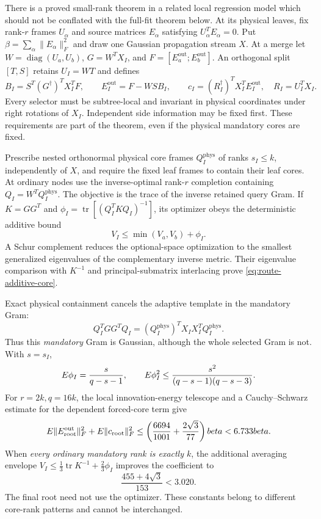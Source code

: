 \documentclass[11pt,oneside,openany,a4paper]{report}
\numberwithin{equation}{chapter}
\theoremstyle{definition}
\theoremstyle{remark}
\DeclareMathOperator{\tr}{tr}\DeclareMathOperator{\rank}{rank}
\DeclareMathOperator{\diag}{diag}\DeclareMathOperator{\range}{range}
\begin{document}
There is a proved small-rank theorem in a related local regression
model which should not be conflated with the full-fit theorem below.
At its physical leaves, fix rank-$r$ frames $U_\alpha$ and source
matrices $E_\alpha$ satisfying $U_\alpha^TE_\alpha=0$.
Put $\beta=\sum_\alpha\lVert E_\alpha\rVert_F^2$ and draw one Gaussian
propagation stream $X$.  At a merge let $W=\diag(U_a,U_b)$,
$G=W^TX_I$, and $F=[E_a^{\mathrm{out}};E_b^{\mathrm{out}}]$.
An orthogonal split $[T,S]$ retains $U_I=WT$ and defines
\[
 B_I=S^T(G^\dagger)^TX_I^TF,\qquad
 E_I^{\mathrm{out}}=F-WSB_I,\qquad
 c_I=(R_I^\dagger)^TX_I^TE_I^{\mathrm{out}},
 \quad R_I=U_I^TX_I.
\]
Every selector must be subtree-local and invariant in physical
coordinates under right rotations of $X_I$.  Independent side
information may be fixed first.  These requirements are part of the
theorem, even if the physical mandatory cores are fixed.

Prescribe nested orthonormal physical core frames $Q_I^{\mathrm{phys}}$
of ranks $s_I\leq k$, independently of $X$, and require the fixed leaf
frames to contain their leaf cores.  At ordinary nodes use the
inverse-optimal rank-$r$ completion containing
$Q_I=W^TQ_I^{\mathrm{phys}}$.  The objective is the trace of the inverse
retained query Gram.  If $K=GG^T$ and
$\phi_I=\tr[(Q_I^TKQ_I)^{-1}]$, its optimizer obeys the deterministic
additive bound
\begin{equation}
 V_I\leq\min(V_a,V_b)+\phi_I.
 \label{eq:route-additive-core}
\end{equation}
A Schur complement reduces the optional-space optimization to the
smallest generalized eigenvalues of the complementary inverse metric.
Their eigenvalue comparison with $K^{-1}$ and principal-submatrix
interlacing prove \eqref{eq:route-additive-core}.

Exact physical containment cancels the adaptive template in the
mandatory Gram:
\[
 Q_I^TGG^TQ_I
 =(Q_I^{\mathrm{phys}})^TX_IX_I^TQ_I^{\mathrm{phys}}.
\]
Thus this \emph{mandatory} Gram is Gaussian, although the whole selected
Gram is not.  With $s=s_I$,
\[
 E\phi_I=\frac{s}{q-s-1},\qquad
 E\phi_I^2\leq\frac{s^2}{(q-s-1)(q-s-3)}.
\]
For $r=2k,q=16k$, the local innovation-energy telescope and a
Cauchy--Schwarz estimate for the dependent forced-core term give
\begin{equation}
 E\lVert E_{\mathrm{root}}^{\mathrm{out}}\rVert_F^2
 +E\lVert c_{\mathrm{root}}\rVert_F^2
 \leq\left(\frac{6694}{1001}+\frac{2\sqrt3}{77}\right)beta
 <6.733beta.
 \label{eq:route-fixed-core}
\end{equation}
When \emph{every ordinary mandatory rank is exactly $k$}, the additional
averaging envelope
$V_I\leq\tfrac13\tr K^{-1}+\tfrac23\phi_I$ improves the coefficient to
\begin{equation}
 \frac{455+4\sqrt3}{153}<3.020.
 \label{eq:route-half-core}
\end{equation}
The final root need not use the optimizer.  These constants belong to
different core-rank patterns and cannot be interchanged.
\end{document}
